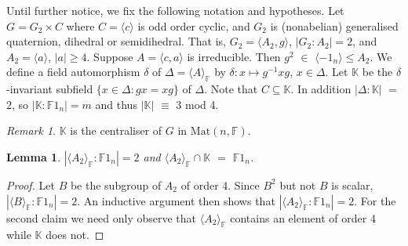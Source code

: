 \documentclass[12pt]{amsart}
\newtheorem{lemma}[theorem]{Lemma}
\theoremstyle{definition}
\theoremstyle{remark}
\newtheorem*{remark}{Remark}
\begin{document}
 Until further notice, we fix the following notation and 
 hypotheses. Let $G = G_2 \times C$ where 
 $C = \langle c\rangle$ is odd order cyclic, 
 and $G_2$ is (nonabelian) generalised quaternion, 
 dihedral or semidihedral. 
 That is, $G_2 = \langle A_2, g\rangle$, 
 $|G_2 : A_2| = 2$, 
 and $A_2 = \langle a\rangle$, $|a| \geq 4$. 
 Suppose $A = \langle c, a\rangle$ is irreducible. 
 Then $g^2$ $\in$ $\langle -1_n \rangle \leq A_2$.
 We define a field automorphism $\delta$ of 
 $\Delta  = \langle A\rangle_\mathbb{F}$ by
 $\delta: x \mapsto g^{-1}xg$, 
 $x \in \Delta$. Let $\mathbb{K}$ be the $\delta$-invariant 
 subfield  $\{x \in \Delta: gx = xg\}$ of $\Delta$. 
 Note that $C \subseteq \mathbb{K}$. In addition
 $|\Delta : \mathbb{K}|$ $=$ $2$, so
 $|\mathbb{K} : \mathbb{F}1_n| = m$ and thus 
 $|\mathbb{K}|$ $\equiv$ 3 mod 4.
\begin{remark}
 $\mathbb{K}$ is the centraliser of $G$ in 
 $\mathrm{Mat}(n, \mathbb{F})$.
\end{remark}
\begin{lemma}
\label{delinv}
 $|\langle A_2\rangle_\mathbb{F} : \mathbb{F}1_n|=2$ 
 and $\langle A_2\rangle_\mathbb{F} \cap \mathbb{K}$ 
 $=$ $\mathbb{F}1_n$.
\end{lemma}
\begin{proof}
 Let $B$ be the subgroup of $A_2$ of order 4. Since 
 $B^2$ but not $B$ is scalar,  
 $|\langle B \rangle_\mathbb{F} : \mathbb{F}1_n| =2$.  
 An inductive argument then shows that 
 $|\langle A_2\rangle_\mathbb{F} : \mathbb{F}1_n| =2$.
 For the second claim we need only  
 observe that $\langle A_2 \rangle_\mathbb{F}$   
 contains an element of order 4 while $\mathbb{K}$ 
 does not.
\end{proof}
\end{document}
